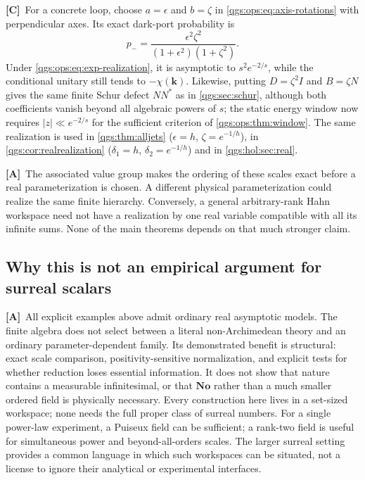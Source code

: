 \documentclass[11pt,oneside]{article}
\numberwithin{equation}{section}
\theoremstyle{plain}
\theoremstyle{definition}
\theoremstyle{remark}
\newcommand{\No}{\mathbf{No}}
\newcommand{\qk}{\mathbf k}
\newcommand{\abs}[1]{\left|#1\right|}
\newcommand{\TC}{\textcolor{TierC}{\textsf{\bfseries[C]}}}
\newcommand{\TA}{\textcolor{TierA}{\textsf{\bfseries[A]}}}
\begin{document}
\TC\ For a concrete loop, choose $a=\epsilon$ and $b=\zeta$ in \eqref{qgs:ops:eq:axis-rotations} with perpendicular axes. Its exact dark-port probability is
\begin{equation}\label{qgs:ops:eq:exp-gate}
 p_- =\frac{\epsilon^2\zeta^2}{(1+\epsilon^2)(1+\zeta^2)}.
\end{equation}
Under \eqref{qgs:ops:eq:exp-realization}, it is asymptotic to $s^2e^{-2/s}$, while the conditional unitary still tends to $-\chi(\qk)$. Likewise, putting $D=\zeta^2I$ and $B=\zeta N$ gives the same finite Schur defect $NN^*$ as in \cref{qgs:sec:schur}, although both coefficients vanish beyond all algebraic powers of $s$; the static energy window now requires $\abs z\ll e^{-2/s}$ for the sufficient criterion of \cref{qgs:ops:thm:window}. The same realization is used in \cref{qgs:thm:alljets} ($\epsilon=h$, $\zeta=e^{-1/h}$), in \cref{qgs:cor:realrealization} ($\delta_1=h$, $\delta_2=e^{-1/h}$) and in \cref{qgs:hol:sec:real}.

\TA\ The associated value group makes the ordering of these scales exact before a real parameterization is chosen. A different physical parameterization could realize the same finite hierarchy. Conversely, a general arbitrary-rank Hahn workspace need not have a realization by one real variable compatible with all its infinite sums. None of the main theorems depends on that much stronger claim.

\subsection{Why this is not an empirical argument for surreal scalars}
\TA\ All explicit examples above admit ordinary real asymptotic models. The finite algebra does not select between a literal non-Archimedean theory and an ordinary parameter-dependent family. Its demonstrated benefit is structural: exact scale comparison, positivity-sensitive normalization, and explicit tests for whether reduction loses essential information. It does not show that nature contains a measurable infinitesimal, or that $\No$ rather than a much smaller ordered field is physically necessary. Every construction here lives in a set-sized workspace; none needs the full proper class of surreal numbers. For a single power-law experiment, a Puiseux field can be sufficient; a rank-two field is useful for simultaneous power and beyond-all-orders scales. The larger surreal setting provides a common language in which such workspaces can be situated, not a license to ignore their analytical or experimental interfaces.
\end{document}
